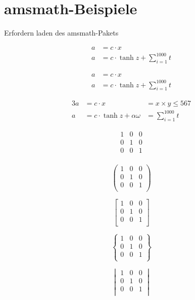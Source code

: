 \documentclass[12pt,ngerman,parskip=half]{scrartcl}
\begin{document}
\section{amsmath-Beispiele}

Erfordern laden des amsmath-Pakets

\begin{align}
a &= c \cdot x \\
a &= c \cdot \tanh z + \sum_{i=1}^{1000} t
\end{align}

\begin{align*}
a &= c \cdot x \\
a &= c \cdot \tanh z + \sum_{i=1}^{1000} t
\end{align*}

\begin{alignat}{3}
a &= c \cdot x &= x\times y \leq 567 \\
a &= c \cdot \tanh z + \alpha\omega &= \sum_{i=1}^{1000} t
\end{alignat}

\[%
\begin{matrix} 
1 & 0 & 0 \\ 
0 & 1 & 0 \\ 
0 & 0 & 1 \\ 
\end{matrix}
\]

\[%
\begin{pmatrix} 
1 & 0 & 0 \\ 
0 & 1 & 0 \\ 
0 & 0 & 1 \\ 
\end{pmatrix}
\]

\[%
\begin{bmatrix} 
1 & 0 & 0 \\ 
0 & 1 & 0 \\ 
0 & 0 & 1 \\ 
\end{bmatrix}
\]

\[%
\begin{Bmatrix} 
1 & 0 & 0 \\ 
0 & 1 & 0 \\ 
0 & 0 & 1 \\ 
\end{Bmatrix}
\]

\[%
\begin{vmatrix} 
1 & 0 & 0 \\ 
0 & 1 & 0 \\ 
0 & 0 & 1 \\ 
\end{vmatrix}
\]
\end{document}
